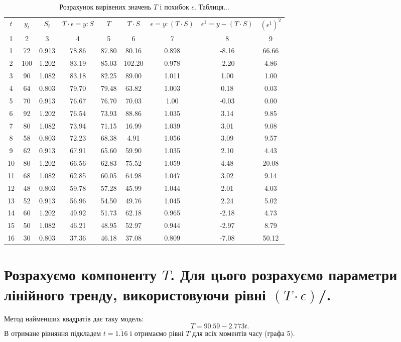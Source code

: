 \documentclass[a4paper, fontsize=10pt, oneside]{article}
\begin{document}
\begin{table}
\caption{Розрахунок вирівених значень $T$ і похибок $\epsilon$. Таблиця...}
\begin{tabular}{|c|c|c|c|c|c|c|c|c|}
\hline
$t$ & $y_{t}$ & $S_{t}$ & $T \cdot \epsilon = y : S$ & $T$ & $T \cdot S$ & $\epsilon = y : (T \cdot S)$ & $\epsilon^{1} = y - (T \cdot S)$ & $(\epsilon^{1})^2$\\
1 & 2 & 3 & 4 & 5 & 6 & 7 & 8 & 9\\
1 & 72 & 0.913 & 78.86 & 87.80 & 80.16 & 0.898 & -8.16 & 66.66\\
\hline
2 & 100 & 1.202 & 83.19 & 85.03 & 102.20 & 0.978 & -2.20 & 4.86\\
\hline
3 & 90 & 1.082 & 83.18 & 82.25 & 89.00 & 1.011 & 1.00 & 1.00\\
\hline
4 & 64 & 0.803 & 79.70 & 79.48 & 63.82 & 1.003 & 0.18 & 0.03\\
\hline
5 & 70 & 0.913 & 76.67 & 76.70 & 70.03 & 1.00 & -0.03 & 0.00\\
\hline
6 & 92 & 1.202 & 76.54 & 73.93 & 88.86 & 1.035 & 3.14 & 9.85\\
\hline
7 & 80 & 1.082 & 73.94 & 71.15 & 16.99 & 1.039 & 3.01 & 9.08\\
\hline
8 & 58 & 0.803 & 72.23 & 68.38 & 4.91 & 1.056 & 3.09 & 9.57\\
\hline
9 & 62 & 0.913 & 67.91 & 65.60 & 59.90 & 1.035 & 2.10 & 4.43\\
\hline
10 & 80 & 1.202 & 66.56 & 62.83 & 75.52 & 1.059 & 4.48 & 20.08 \\
\hline
11 & 68 & 1.082 & 62.85 & 60.05 & 64.98 & 1.047 & 3.02 & 9.14\\
\hline
12 & 48 & 0.803 & 59.78 & 57.28 & 45.99 & 1.044 & 2.01 & 4.03\\
\hline
13 & 52 & 0.913 & 56.96 & 54.50 & 49.76 & 1.045 & 2.24 & 5.02\\
\hline
14 & 60 & 1.202 & 49.92 & 51.73 & 62.18 & 0.965 & -2.18 & 4.73\\
\hline
15 & 50 & 1.082 & 46.21 & 48.95 & 52.97 & 0.944 & -2.97 & 8.79\\
\hline
16 & 30 & 0.803 & 37.36 & 46.18 & 37.08 & 0.809 & -7.08 & 50.12\\
\hline
\end{tabular}
\end{table}

\addtocounter{section}{3}

\section{\rm \normalsize Розрахуємо компоненту $T$. Для цього розрахуємо параметри лінійного тренду, використовуючи рівні $(T \cdot \epsilon)$/.}
Метод найменших квадратів дає таку модель:
$$T = 90.59 - 2.773t.$$
В отримане рівняння підкладем $t = 	\overline{1.16}$ і отримаємо рівні $T$ для всіх моментів часу (графа 5).
\end{document}
